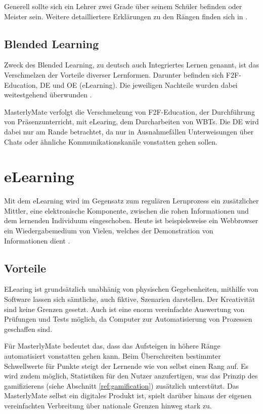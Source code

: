 Generell sollte sich ein Lehrer zwei Grade über seinem Schüler befinden oder
Meister sein. Weitere detailliertere Erklärungen zu den Rängen finden sich in
\cite{gruben:2012}.

\subsection{Blended Learning}\label{ref:blendedLearning}
Zweck des Blended Learning, zu deutsch auch Integriertes Lernen genannt, ist das
Verschmelzen der Vorteile diverser Lernformen. Darunter befinden sich
\ac{F2F}-Education, \ac{DE} und \ac{OE} (eLearning). Die jeweiligen Nachteile
wurden dabei weitestgehend überwunden \cite{kroeger:2004}.

MasterlyMate verfolgt die Verschmelzung von F2F-Education, der Durchführung von
Präsenzunterricht, mit eLearing, dem Durcharbeiten von WBTs. Die DE wird dabei
nur am Rande betrachtet, da nur in Ausnahmefällen Unterweisungen über Chats oder
ähnliche Kommunikationskanäle vonstatten gehen sollen.

\section{eLearning}
Mit dem eLearning wird im Gegensatz zum regulären Lernprozess ein zusätzlicher
Mittler, eine elektronische Komponente, zwischen die rohen Informationen und dem
lernenden Individuum eingeschoben. Heute ist beispielsweise ein Webbrowser ein
Wiedergabemedium von Vielen, welches der Demonstration von Informationen dient
\cite{baumgartner:2002}.

\subsection{Vorteile}
ELearing ist grundsätzlich unabhänig von physischen Gegebenheiten, mithilfe von
Software lassen sich sämtliche, auch fiktive, Szenarien darstellen. Der
Kreativität sind keine Grenzen gesetzt. Auch ist eine enorm vereinfachte
Auswertung von Prüfungen und Tests möglich, da Computer zur Automatisierung von
Prozessen geschaffen sind. 

Für MasterlyMate bedeutet das, dass das Aufsteigen in höhere Ränge automatisiert
vonstatten gehen kann. Beim Überschreiten bestimmter Schwellwerte für Punkte
steigt der Lernende wie von selbst einen Rang auf. Es wird zudem möglich,
Statistiken für den Nutzer anzufertigen, was das Prinzip des gamifizierens
(siehe Abschnitt \ref{ref:gamification}) zusätzlich unterstützt. Das
MasterlyMate selbst ein digitales Produkt ist, spielt darüber hinaus der eigenen
vereinfachten Verbreitung über nationale Grenzen hinweg stark zu.

